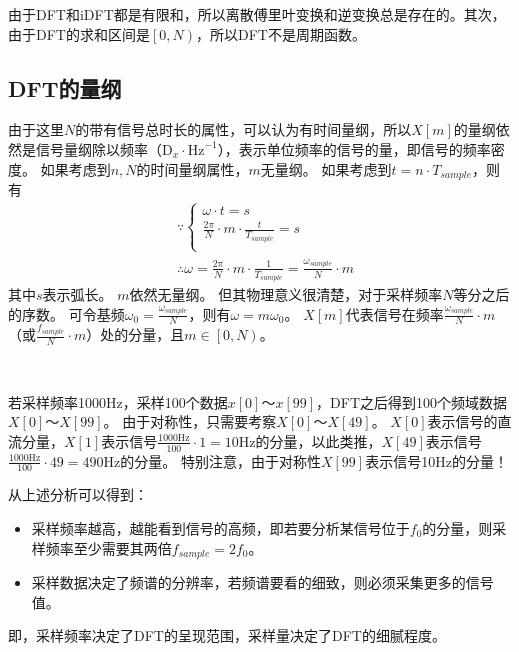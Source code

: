 由于DFT和iDFT都是有限和，所以离散傅里叶变换和逆变换总是存在的。其次，由于DFT的求和区间是$\left[ 0,N \right) $，所以DFT不是周期函数。

\subsection{DFT的量纲}

由于这里$N$的带有信号总时长的属性，可以认为有时间量纲，所以$X\left[ m \right] $的量纲依然是信号量纲除以频率（$\mathrm{D}_x\cdot \mathrm{Hz}^{-1}$），表示单位频率的信号的量，即信号的频率密度。
如果考虑到$n,N$的时间量纲属性，$m$无量纲。
如果考虑到$t=n\cdot T_{sample}$，则有
\begin{align*}
&\because \begin{cases}
	\omega \cdot t=s\\
	\frac{2\pi}{N}\cdot m\cdot \frac{t}{T_{sample}}=s\\
\end{cases} \\
&\therefore \omega =\frac{2\pi}{N}\cdot m\cdot \frac{1}{T_{sample}}=\frac{\omega _{sample}}{N}\cdot m
\end{align*}
其中$s$表示弧长。
$m$依然无量纲。
但其物理意义很清楚，对于采样频率$N$等分之后的序数。
可令基频$\omega _0=\frac{\omega _{sample}}{N}$，则有$\omega =m\omega _0$。
$X\left[ m \right] $代表信号在频率$\frac{\omega _{sample}}{N}\cdot m$（或$\frac{f_{sample}}{N}\cdot m$）处的分量，且$m\in \left[ 0,N \right) $。

~

若采样频率1000Hz，采样100个数据$x\left[ 0 \right] \text{～}x\left[ 99 \right] $，DFT之后得到100个频域数据$X\left[ 0 \right] \text{～}X\left[ 99 \right] $。
由于对称性，只需要考察$X\left[ 0 \right] \text{～}X\left[ 49 \right] $。
$X\left[ 0 \right] $表示信号的直流分量，$X\left[ 1 \right] $表示信号$\frac{1000\mathrm{Hz}}{100}\cdot 1=10\mathrm{Hz}$的分量，以此类推，$X\left[ 49 \right] $表示信号$\frac{1000\mathrm{Hz}}{100}\cdot 49=490\mathrm{Hz}$的分量。
特别注意，由于对称性$X\left[ 99 \right] $表示信号10Hz的分量！

从上述分析可以得到：
\begin{itemize}
    \item 采样频率越高，越能看到信号的高频，即若要分析某信号位于$f_0$的分量，则采样频率至少需要其两倍$f_{sample}=2f_0$。
    \item 采样数据决定了频谱的分辨率，若频谱要看的细致，则必须采集更多的信号值。
\end{itemize}
即，采样频率决定了DFT的呈现范围，采样量决定了DFT的细腻程度。

